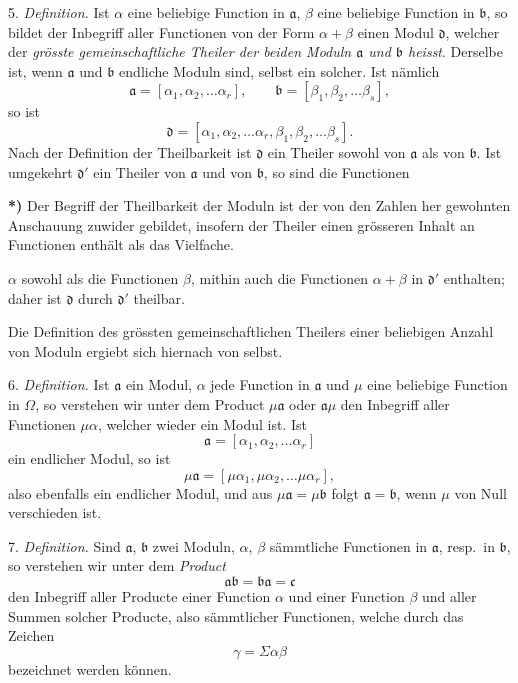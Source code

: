\documentclass{article}
\begin{document}
5. \emph{Definition.} Ist $\alpha$ eine beliebige Function in $\mathfrak{a}$, $\beta$ eine beliebige Function in $\mathfrak{b}$, so bildet der Inbegriff aller Functionen von der Form $\alpha + \beta$ einen Modul $\mathfrak{d}$, welcher der \emph{grösste gemeinschaftliche Theiler der beiden Moduln $\mathfrak{a}$ und $\mathfrak{b}$ heisst}. Derselbe ist, wenn $\mathfrak{a}$ und $\mathfrak{b}$ endliche Moduln sind, selbst ein solcher. Ist nämlich
\[ \mathfrak{a} = [\alpha_{1}, \alpha_{2}, \ldots \alpha_{r}], \qquad \mathfrak{b} = [\beta_{1}, \beta_{2}, \ldots \beta_{s}], \]
so ist
\[ \mathfrak{d} = [\alpha_{1}, \alpha_{2}, \ldots \alpha_{r}, \beta_{1}, \beta_{2}, \ldots \beta_{s}]. \]
Nach der Definition der Theilbarkeit ist $\mathfrak{d}$ ein Theiler sowohl von $\mathfrak{a}$ als von $\mathfrak{b}$. Ist umgekehrt $\mathfrak{d}'$ ein Theiler von $\mathfrak{a}$ und von $\mathfrak{b}$, so sind die Functionen

\textbf{*)} Der Begriff der Theilbarkeit der Moduln ist der von den Zahlen her gewohnten Anschauung zuwider gebildet, insofern der Theiler einen grösseren Inhalt an Functionen enthält als das Vielfache.

$\alpha$ sowohl als die Functionen $\beta$, mithin auch die Functionen $\alpha + \beta$ in $\mathfrak{d}'$ enthalten; daher ist $\mathfrak{d}$ durch $\mathfrak{d}'$ theilbar.

Die Definition des grössten gemeinschaftlichen Theilers einer beliebigen Anzahl von Moduln ergiebt sich hiernach von selbst.

6. \emph{Definition.} Ist $\mathfrak{a}$ ein Modul, $\alpha$ jede Function in $\mathfrak{a}$ und $\mu$ eine beliebige Function in $\Omega$, so verstehen wir unter dem Product $\mu\mathfrak{a}$ oder $\mathfrak{a}\mu$ den Inbegriff aller Functionen $\mu\alpha$, welcher wieder ein Modul ist. Ist
\[ \mathfrak{a} = [\alpha_{1}, \alpha_{2}, \ldots \alpha_{r}] \]
ein endlicher Modul, so ist
\[ \mu\mathfrak{a} = [\mu\alpha_{1}, \mu\alpha_{2}, \ldots \mu\alpha_{r}], \]
also ebenfalls ein endlicher Modul, und aus $\mu\mathfrak{a} = \mu\mathfrak{b}$ folgt $\mathfrak{a} = \mathfrak{b}$, wenn $\mu$ von Null verschieden ist.

7. \emph{Definition.} Sind $\mathfrak{a}$, $\mathfrak{b}$ zwei Moduln, $\alpha$, $\beta$ sämmtliche Functionen in $\mathfrak{a}$, resp.\ in $\mathfrak{b}$, so verstehen wir unter dem \emph{Product}
\[ \mathfrak{a}\mathfrak{b} = \mathfrak{b}\mathfrak{a} = \mathfrak{c} \]
den Inbegriff aller Producte einer Function $\alpha$ und einer Function $\beta$ und aller Summen solcher Producte, also sämmtlicher Functionen, welche durch das Zeichen
\[ \gamma = \Sigma\alpha\beta \]
bezeichnet werden können.
\end{document}
